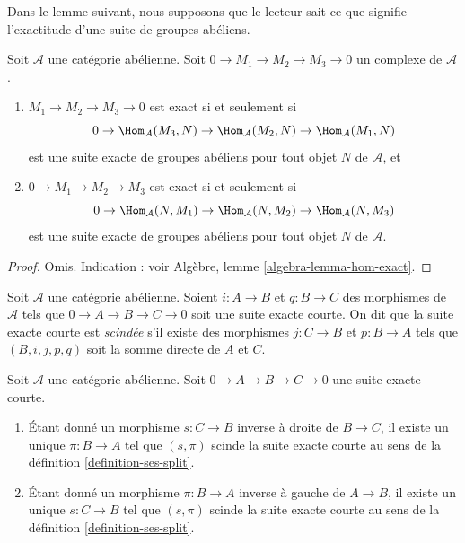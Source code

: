\noindent
Dans le lemme suivant, nous supposons que le lecteur sait ce que signifie
l'exactitude d'une suite de groupes abéliens.

\begin{lemma}
\label{lemma-check-exactness}
Soit $\mathcal{A}$ une catégorie abélienne.
Soit $0 \to M_1 \to M_2 \to M_3 \to 0$ un complexe de $\mathcal{A}$.
\begin{enumerate}
\item $M_1 \to M_2 \to M_3 \to 0$ est exact si et seulement si
$$
0 \to \Hom_\mathcal{A}(M_3, N) \to
\Hom_\mathcal{A}(M_2, N) \to \Hom_\mathcal{A}(M_1, N)
$$
est une suite exacte de groupes abéliens pour tout objet $N$ de
$\mathcal{A}$, et
\item $0 \to M_1 \to M_2 \to M_3$ est exact si et seulement si
$$
0 \to \Hom_\mathcal{A}(N, M_1) \to \Hom_\mathcal{A}(N, M_2) \to
\Hom_\mathcal{A}(N, M_3)
$$
est une suite exacte de groupes abéliens pour tout objet $N$ de $\mathcal{A}$.
\end{enumerate}
\end{lemma}

\begin{proof}
Omis. Indication : voir
Algèbre, lemme \ref{algebra-lemma-hom-exact}.
\end{proof}

\begin{definition}
\label{definition-ses-split}
Soit $\mathcal{A}$ une catégorie abélienne.
Soient $i : A \to B$ et $q : B \to C$ des morphismes
de $\mathcal{A}$ tels que
$0 \to A \to B \to C \to 0$ soit une suite
exacte courte. On dit que la suite exacte courte
est {\it scindée} s'il existe
des morphismes $j : C \to B$ et $p : B \to A$ tels
que $(B, i, j, p, q)$ soit la somme directe de $A$ et $C$.
\end{definition}

\begin{lemma}
\label{lemma-ses-split}
Soit $\mathcal{A}$ une catégorie abélienne.
Soit $0 \to A \to B \to C \to 0$
une suite exacte courte.
\begin{enumerate}
\item Étant donné un morphisme $s : C \to B$ inverse à droite de
$B \to C$, il existe un unique $\pi : B \to A$
tel que $(s, \pi)$ scinde la suite exacte courte
au sens de la définition \ref{definition-ses-split}.
\item Étant donné un morphisme $\pi : B \to A$ inverse à gauche de
$A \to B$, il existe un unique $s : C \to B$
tel que $(s, \pi)$ scinde la suite exacte courte
au sens de la définition \ref{definition-ses-split}.
\end{enumerate}
\end{lemma}

